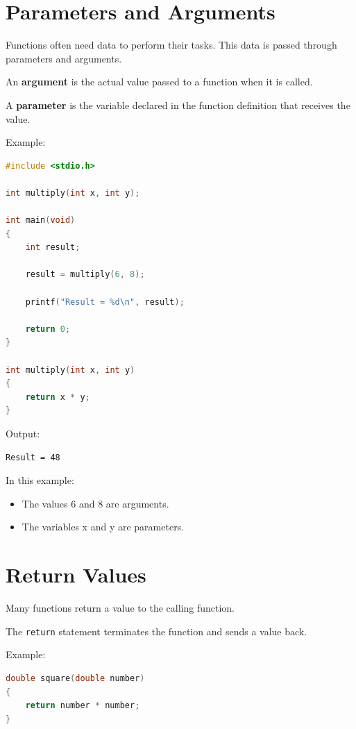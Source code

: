 \documentclass[12pt,openany]{book}
\begin{document}
\section{Parameters and Arguments}

Functions often need data to perform their tasks. This data is passed through parameters and arguments.

An \textbf{argument} is the actual value passed to a function when it is called.

A \textbf{parameter} is the variable declared in the function definition that receives the value.

Example:

\begin{lstlisting}[language=C]
#include <stdio.h>

int multiply(int x, int y);

int main(void)
{
    int result;

    result = multiply(6, 8);

    printf("Result = %d\n", result);

    return 0;
}

int multiply(int x, int y)
{
    return x * y;
}
\end{lstlisting}

Output:

\begin{lstlisting}
Result = 48
\end{lstlisting}

In this example:

\begin{itemize}
    \item The values 6 and 8 are arguments.
    \item The variables x and y are parameters.
\end{itemize}

\section{Return Values}

Many functions return a value to the calling function.

The \texttt{return} statement terminates the function and sends a value back.

Example:

\begin{lstlisting}[language=C]
double square(double number)
{
    return number * number;
}
\end{lstlisting}
\end{document}
